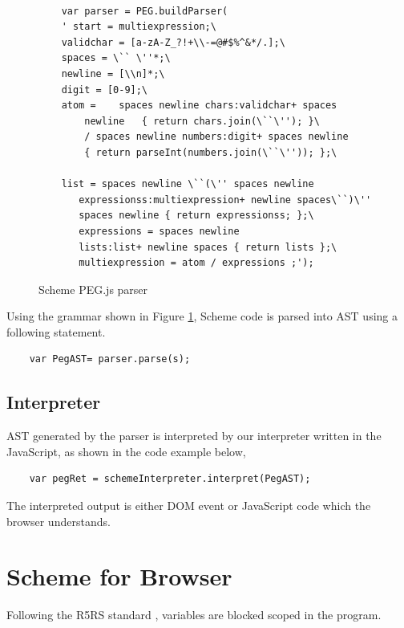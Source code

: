 \begin{figure}[h]
	\begin{lstlisting}  

	var parser = PEG.buildParser( 
	' start = multiexpression;\
	validchar = [a-zA-Z_?!+\\-=@#$%^&*/.];\
	spaces = \`` \''*;\
	newline = [\\n]*;\
	digit = [0-9];\
	atom =    spaces newline chars:validchar+ spaces 
	    newline   { return chars.join(\``\''); }\
	    / spaces newline numbers:digit+ spaces newline     
        { return parseInt(numbers.join(\``\'')); };\
    
	list = spaces newline \``(\'' spaces newline 
	   expressionss:multiexpression+ newline spaces\``)\''
	   spaces newline { return expressionss; };\
	   expressions = spaces newline 
	   lists:list+ newline spaces { return lists };\
	   multiexpression = atom / expressions ;');
	\end{lstlisting}
	\caption{Scheme PEG.js parser}
	\label{fig:schemepeg}
\end{figure}

Using the grammar shown in Figure \ref{fig:schemepeg}, Scheme code is parsed into AST using a following statement.

\begin{lstlisting}
	var PegAST= parser.parse(s);
\end{lstlisting}




\subsection{Interpreter}

AST generated by the parser is interpreted by our interpreter written in the JavaScript, as shown in the code example below,


\begin{lstlisting}
	var pegRet = schemeInterpreter.interpret(PegAST);
\end{lstlisting}


The interpreted output is either DOM event or JavaScript code which the browser understands.

\section{Scheme for Browser} 

Following the R5RS standard \cite{Adams:1998:RRA:290229.290234}, variables are  blocked scoped in the program. 

